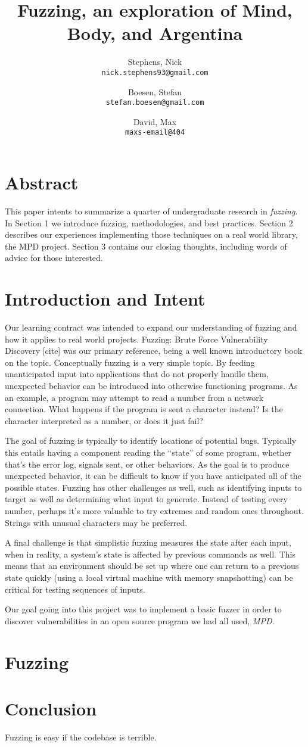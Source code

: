 \documentclass[10pt]{article}
\author{
  Stephens, Nick\\
  \texttt{nick.stephens93@gmail.com}
  \and
  Boesen, Stefan\\
  \texttt{stefan.boesen@gmail.com}
  \and
  David, Max\\
  \texttt{maxs-email@404}
}
\title{Fuzzing, an exploration of Mind, Body, and Argentina}
\begin{document}
  \maketitle

\section*{Abstract}
This paper intents to summarize a quarter of undergraduate research in \emph{fuzzing}. In Section 1 we introduce fuzzing, methodologies, and best practices. Section 2 describes our experiences implementing those techniques on a real world library, the MPD project. Section 3 contains our closing thoughts, including words of advice for those interested.

\section{Introduction and Intent}
Our learning contract was intended to expand our understanding of fuzzing and how it applies to real world projects. Fuzzing: Brute Force Vulnerability Discovery [cite] was our primary reference, being a well known introductory book on the topic. Conceptually fuzzing is a very simple topic. By feeding unanticipated input into applications that do not properly handle them, unexpected behavior can be introduced into otherwise functioning programs. As an example, a program may attempt to read a number from a network connection. What happens if the program is sent a character instead? Is the character interpreted as a number, or does it just fail? 

The goal of fuzzing is typically to identify locations of potential bugs. Typically this entails having a component reading the ``state'' of some program, whether that's the error log, signals sent, or other behaviors. As the goal is to produce unexpected behavior, it can be difficult to know if you have anticipated all of the possible states. Fuzzing has other challenges as well, such as identifying inputs to target as well as determining what input to generate. Instead of testing every number, perhaps it's more valuable to try extremes and random ones throughout. Strings with unusual characters may be preferred.

A final challenge is that simplistic fuzzing measures the state after each input, when in reality, a system's state is affected by previous commands as well. This means that an environment should be set up where one can return to a previous state quickly (using a local virtual machine with memory snapshotting) can be critical for testing sequences of inputs.

Our goal going into this project was to implement a basic fuzzer in order to discover vulnerabilities in an open source program we had all used, \emph{MPD}.
\section{Fuzzing}

\section{Conclusion}
Fuzzing is easy if the codebase is terrible.
\end{document}
